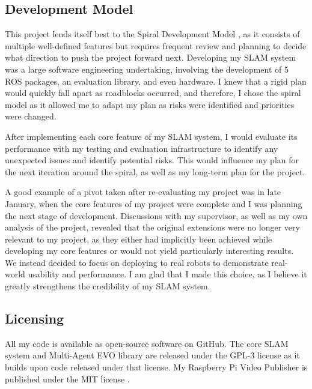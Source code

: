 \subsection{Development Model}
\label{sec:development-model}
This project lends itself best to the Spiral Development Model \autocite{59}, as it consists of multiple well-defined features but requires frequent review and planning to decide what direction to push the project forward next. Developing my SLAM system was a large software engineering undertaking, involving the development of 5 ROS packages, an evaluation library, and even hardware. I knew that a rigid plan would quickly fall apart as roadblocks occurred, and therefore, I chose the spiral model as it allowed me to adapt my plan as risks were identified and priorities were changed.

After implementing each core feature of my SLAM system, I would evaluate its performance with my testing and evaluation infrastructure to identify any unexpected issues and identify potential risks. This would influence my plan for the next iteration around the spiral, as well as my long-term plan for the project.

A good example of a pivot taken after re-evaluating my project was in late January, when the core features of my project were complete and I was planning the next stage of development. Discussions with my supervisor, as well as my own analysis of the project, revealed that the original extensions were no longer very relevant to my project, as they either had implicitly been achieved while developing my core features or would not yield particularly interesting results. We instead decided to focus on deploying to real robots to demonstrate real-world usability and performance. I am glad that I made this choice, as I believe it greatly strengthens the credibility of my SLAM system.

\subsection{Licensing}
\label{sec:licensing}
All my code is available as open-source software on GitHub. The core SLAM system and Multi-Agent EVO library are released under the GPL-3 license \autocite{gplv3} as it builds upon code released under that license. My Raspberry Pi Video Publisher is published under the MIT license \autocite{mit}.



